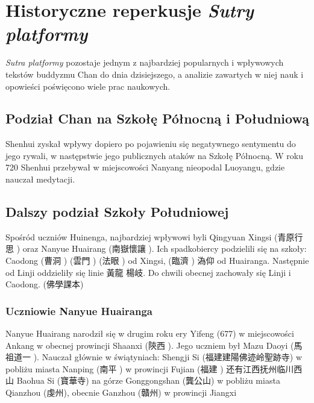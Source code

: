 \chapter{Historyczne reperkusje \textit{Sutry platformy}}
\textit{Sutra platformy} pozostaje jednym z najbardziej popularnych i wpływowych tekstów buddyzmu Chan do dnia dzisiejszego, a analizie zawartych w niej nauk i opowieści poświęcono wiele prac naukowych.

\section{Podział Chan na Szkołę Północną i Południową}
Shenhui zyskał wpływy dopiero po pojawieniu się negatywnego sentymentu do jego rywali, w następstwie jego publicznych ataków na Szkołę Północną.
W roku 720 Shenhui przebywał w miejscowości Nanyang nieopodal Luoyangu, gdzie nauczał medytacji.

\section{Dalszy podział Szkoły Południowej}
Spośród uczniów Huinenga, najbardziej wpływowi byli Qingyuan Xingsi (青原行思 ) oraz Nanyue Huairang (南嶽懷讓 ).
Ich spadkobiercy podzielili się na szkoły: Caodong (曹洞 ) (雲門 ) (法眼 ) od Xingsi, (臨濟 ) 溈仰 od Huairanga.
Następnie od Linji oddzieliły się linie 黃龍 楊岐. Do chwili obecnej zachowały się Linji i Caodong. (佛學課本)

\subsection{Uczniowie Nanyue Huairanga}
Nanyue Huairang narodził się w drugim roku ery Yifeng (677) w miejscowości Ankang w obecnej prowincji Shaanxi (陝西 ).
Jego uczniem był Mazu Daoyi (馬祖道一 ).
Nauczał głównie w świątyniach: Shengji Si (福建建陽佛迹岭聖跡寺) w pobliżu miasta Nanping (南平 ) w prowincji Fujian (福建 )
还有江西抚州临川西山
Baohua Si (寶華寺) na górze Gonggongshan (龔公山) w pobliżu miasta Qianzhou (虔州), obecnie Ganzhou (贛州) w prowincji Jiangxi


